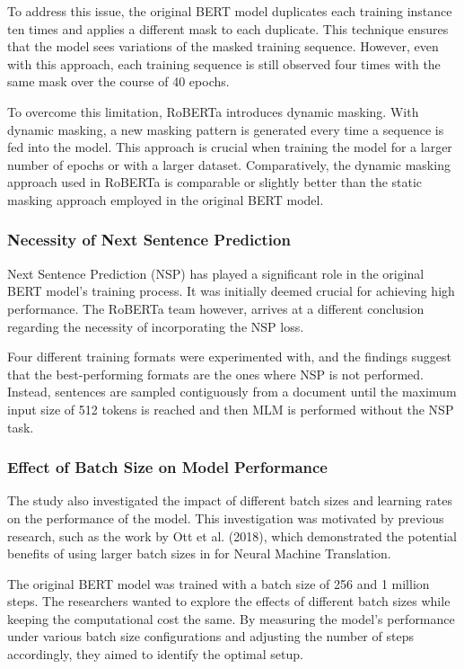 \documentclass[a4paper,12pt]{report} %
\begin{document}
To address this issue, the original BERT model duplicates each training instance ten times and applies a different mask to each duplicate. This technique ensures that the model sees variations of the masked training sequence. However, even with this approach, each training sequence is still observed four times with the same mask over the course of 40 epochs.

To overcome this limitation, RoBERTa introduces dynamic masking. With dynamic masking, a new masking pattern is generated every time a sequence is fed into the model. This approach is crucial when training the model for a larger number of epochs or with a larger dataset. Comparatively, the dynamic masking approach used in RoBERTa is comparable or slightly better than the static masking approach employed in the original BERT model.

\subsubsection{Necessity of Next Sentence Prediction}
Next Sentence Prediction (NSP) has played a significant role in the original BERT model's training process. It was initially deemed crucial for achieving high performance. The RoBERTa team however, arrives at a different conclusion regarding the necessity of incorporating the NSP loss.

Four different training formats were experimented with, and the findings suggest that the best-performing formats are the ones where NSP is not performed. Instead, sentences are sampled contiguously from a document until the maximum input size of 512 tokens is reached and then MLM is performed without the NSP task.

\subsubsection{Effect of Batch Size on Model Performance}
The study also investigated the impact of different batch sizes and learning rates on the performance of the model. This investigation was motivated by previous research, such as the work by Ott et al. (2018), which demonstrated the potential benefits of using larger batch sizes in for Neural Machine Translation.

The original BERT model was trained with a batch size of 256 and 1 million steps. The researchers wanted to explore the effects of different batch sizes while keeping the computational cost the same. By measuring the model's performance under various batch size configurations and adjusting the number of steps accordingly, they aimed to identify the optimal setup.
\end{document}
